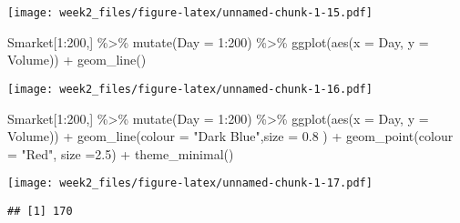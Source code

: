 \documentclass[
]{article}
\newenvironment{Shaded}{\begin{snugshade}}{\end{snugshade}}
\newcommand{\AttributeTok}[1]{\textcolor[rgb]{0.77,0.63,0.00}{#1}}
\newcommand{\DecValTok}[1]{\textcolor[rgb]{0.00,0.00,0.81}{#1}}
\newcommand{\FloatTok}[1]{\textcolor[rgb]{0.00,0.00,0.81}{#1}}
\newcommand{\FunctionTok}[1]{\textcolor[rgb]{0.00,0.00,0.00}{#1}}
\newcommand{\NormalTok}[1]{#1}
\newcommand{\SpecialCharTok}[1]{\textcolor[rgb]{0.00,0.00,0.00}{#1}}
\newcommand{\StringTok}[1]{\textcolor[rgb]{0.31,0.60,0.02}{#1}}
\begin{document}
\texttt{[image: week2\_files/figure-latex/unnamed-chunk-1-15.pdf]}

\begin{Shaded}
\begin{Highlighting}[]
\NormalTok{  Smarket[}\DecValTok{1}\SpecialCharTok{:}\DecValTok{200}\NormalTok{,] }\SpecialCharTok{\%\textgreater{}\%}
    \FunctionTok{mutate}\NormalTok{(}\AttributeTok{Day =} \DecValTok{1}\SpecialCharTok{:}\DecValTok{200}\NormalTok{) }\SpecialCharTok{\%\textgreater{}\%}
    \FunctionTok{ggplot}\NormalTok{(}\FunctionTok{aes}\NormalTok{(}\AttributeTok{x =}\NormalTok{ Day, }\AttributeTok{y =}\NormalTok{ Volume)) }\SpecialCharTok{+} \FunctionTok{geom\_line}\NormalTok{() }
\end{Highlighting}
\end{Shaded}

\texttt{[image: week2\_files/figure-latex/unnamed-chunk-1-16.pdf]}

\begin{Shaded}
\begin{Highlighting}[]
\NormalTok{  Smarket[}\DecValTok{1}\SpecialCharTok{:}\DecValTok{200}\NormalTok{,] }\SpecialCharTok{\%\textgreater{}\%}
    \FunctionTok{mutate}\NormalTok{(}\AttributeTok{Day =} \DecValTok{1}\SpecialCharTok{:}\DecValTok{200}\NormalTok{) }\SpecialCharTok{\%\textgreater{}\%}
    \FunctionTok{ggplot}\NormalTok{(}\FunctionTok{aes}\NormalTok{(}\AttributeTok{x =}\NormalTok{ Day, }\AttributeTok{y =}\NormalTok{ Volume)) }\SpecialCharTok{+} \FunctionTok{geom\_line}\NormalTok{(}\AttributeTok{colour =} \StringTok{"Dark Blue"}\NormalTok{,}\AttributeTok{size =} \FloatTok{0.8}\NormalTok{ ) }\SpecialCharTok{+}
    \FunctionTok{geom\_point}\NormalTok{(}\AttributeTok{colour =} \StringTok{"Red"}\NormalTok{, }\AttributeTok{size =}\FloatTok{2.5}\NormalTok{) }\SpecialCharTok{+} \FunctionTok{theme\_minimal}\NormalTok{()}
\end{Highlighting}
\end{Shaded}

\texttt{[image: week2\_files/figure-latex/unnamed-chunk-1-17.pdf]}

\begin{Shaded}
\end{Shaded}

\begin{verbatim}
## [1] 170
\end{verbatim}
\end{document}
